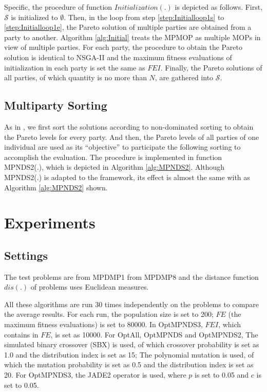 \documentclass[preprint,12pt]{elsarticle}
\begin{document}
Specific, the procedure of function $Initialization(.)$ is depicted as follows.
First, $\mathcal{S}$ is initialized to $\emptyset$.
Then, in the loop from step \ref{step:Initialloop1s} to \ref{step:Initialloop1e}, the Pareto solution of multiple parties are obtained from a party to another.
Algorithm \ref{alg:Initial} treats the MPMOP as multiple MOPs in view of multiple parties.
For each party, the procedure to obtain the Pareto solution is identical to NSGA-II and the maximum fitness evaluations of initialization in each party is set the same as $FEI$.
Finally, the Pareto solutions of all parties, of which quantity is no more than $N$, are gathered into $\mathcal{S}$.


\subsection{Multiparty Sorting}

As in \cite{she2021new}, we first sort the solutions according to non-dominated sorting to obtain the Pareto levels for every party.
And then, the Pareto levels of all parties of one individual are used as its ``objective'' to participate the following sorting to accomplish the evaluation.
The procedure is implemented in function MPNDS2(.), which is depicted in Algorithm \ref{alg:MPNDS2}.
Although MPNDS2(.) is adapted to the framework, its effect is almost the same with \cite{she2021new} as Algorithm \ref{alg:MPNDS2} shown.


\section{Experiments}\label{sec:experiment}

\subsection{Settings}
The test problems are from MPDMP1 from MPDMP8 and the distance function $dis(.)$ of problems uses Euclidean measures.

All these algorithms are run 30 times independently on the problems to compare the average results. For each run, the population size is set to 200; $FE$ (the maximum fitness evaluations) is set to 80000.
In OptMPNDS3, $FEI$, which contains in $FE$, is set as 10000.
For OptAll, OptMPNDS and OptMPNDS2, The simulated binary crossover (SBX) \cite{deb2007self} is used, of which crossover probability is set as 1.0 and the distribution index is set as 15; The polynomial mutation is used, of which the mutation probability is set as 0.5 and the distribution index is set as 20.
For OptMPNDS3, the JADE2 operator is used, where $p$ is set to 0.05 and $c$ is set to 0.05.
\end{document}
